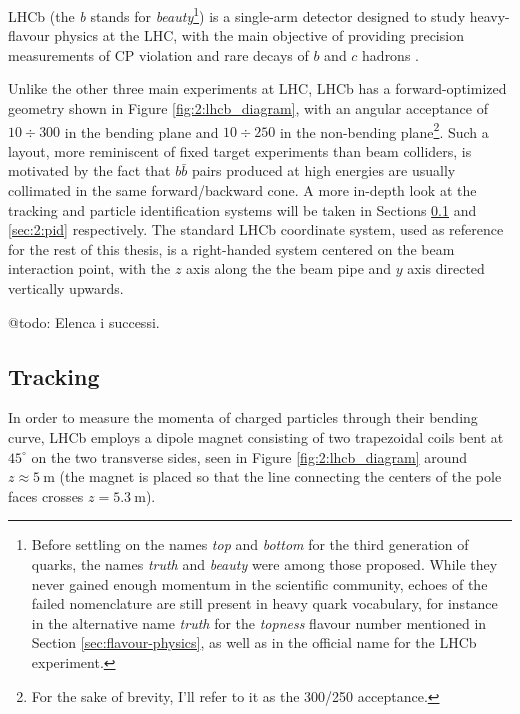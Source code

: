 LHCb (the \textit{b} stands for \textit{beauty}\footnote{Before settling on the names \textit{top} and \textit{bottom} for the third generation of quarks, the names \textit{truth} and \textit{beauty} were among those proposed. While they never gained enough momentum in the scientific community, echoes of the failed nomenclature are still present in heavy quark vocabulary, for instance in the alternative name \textit{truth} for the \textit{topness} flavour number mentioned in Section \ref{sec:flavour-physics}, as well as in the official name for the LHCb experiment.}) is a single-arm detector designed to study heavy-flavour physics at the LHC, with the main objective of providing precision measurements of CP violation and rare decays of $b$ and $c$ hadrons \cite{Alves:1129809}.

Unlike the other three main experiments at LHC, LHCb has a forward-optimized geometry shown in Figure \ref{fig:2:lhcb_diagram}, with an angular acceptance of $10\div300$ \si{\mrad} in the bending plane and $10\div250$ \si{\mrad} in the non-bending plane\footnote{For the sake of brevity, I'll refer to it as the 300/250 \si{\mrad} acceptance.}.
Such a layout, more reminiscent of fixed target experiments than beam colliders, is motivated by the fact that $b\bar{b}$ pairs produced at high energies are usually collimated in the same forward/backward cone.
A more in-depth look at the tracking and particle identification systems will be taken in Sections \ref{sec:2:tracking} and \ref{sec:2:pid} respectively.
\label{info:LHCb_system}
The standard LHCb coordinate system, used as reference for the rest of this thesis, is a right-handed system centered on the beam interaction point, with the $z$ axis along the the beam pipe and $y$ axis directed vertically upwards.

@todo: Elenca i successi.

\subsection{Tracking}
\label{sec:2:tracking}
In order to measure the momenta of charged particles through their bending curve, LHCb employs a dipole magnet \cite{Amato:424338} consisting of two trapezoidal coils bent at $45^\circ$ on the two transverse sides, seen in Figure \ref{fig:2:lhcb_diagram} around $z\approx \SI{5}{\meter}$ (the magnet is placed so that the line connecting the centers of the pole faces crosses $z=\SI{5.3}{\meter}$).

